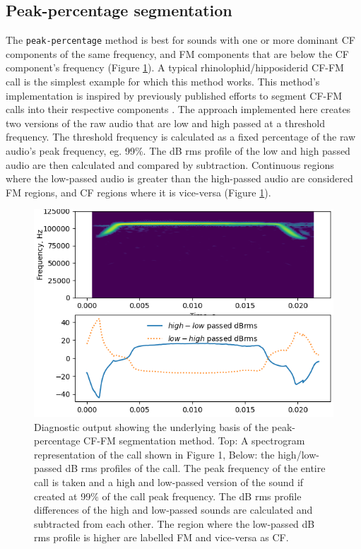 \documentclass[
]{book}
\begin{document}
\hypertarget{peak-percentage-segmentation}{%
\subsection{Peak-percentage segmentation}\label{peak-percentage-segmentation}}

The \texttt{peak-percentage} method is best for sounds with one or more dominant CF components of the same frequency, and FM components that are below the CF component's frequency (Figure \ref{fig:pkpctgdiags}). A typical rhinolophid/hipposiderid CF-FM call is the simplest example for which this method works. This method's implementation is inspired by previously published efforts to segment CF-FM calls into their respective components \citep{lu2020echolocating, tian1997echolocation, schoeppler2018precise}. The approach implemented here creates two versions of the raw audio that are low and high passed at a threshold frequency. The threshold frequency is calculated as a fixed percentage of the raw audio's peak frequency, eg. 99\%. The dB rms profile of the low and high passed audio are then calculated and compared by subtraction. Continuous regions where the low-passed audio is greater than the high-passed audio are considered FM regions, and CF regions where it is vice-versa (Figure \ref{fig:pkpctgdiags}).

\begin{figure}
\includegraphics[width=1\linewidth]{original_papers/itsfm-paper/figures/pkpctage_profiles} \caption{Diagnostic output showing the underlying basis of the peak-percentage CF-FM segmentation method. Top: A spectrogram representation of the call shown in Figure 1, Below: the high/low-passed dB rms profiles of the call. The peak frequency of the entire call is taken and a high and low-passed version of the sound if created at 99$\%$ of the call peak frequency. The dB rms profile differences of the high and low-passed sounds are calculated and subtracted from each other. The region where the low-passed dB rms profile is higher are labelled FM and vice-versa as CF. }\label{fig:pkpctgdiags}
\end{figure}
\end{document}
